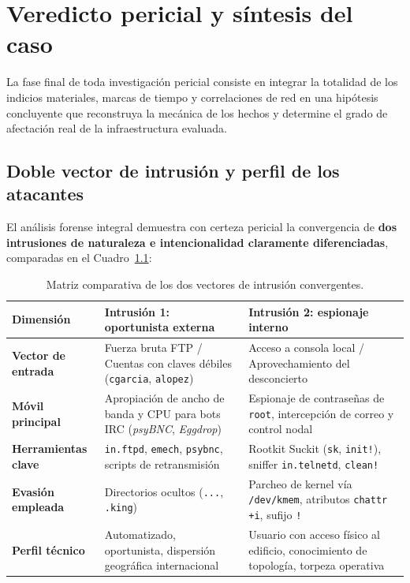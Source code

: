 \chapter{Veredicto pericial y síntesis del caso}
\label{cap:veredicto_y_atribucion}

La fase final de toda investigación pericial consiste en integrar la totalidad de los indicios materiales, marcas de tiempo y correlaciones de red en una hipótesis concluyente que reconstruya la mecánica de los hechos y determine el grado de afectación real de la infraestructura evaluada.

\section{Doble vector de intrusión y perfil de los atacantes}

El análisis forense integral demuestra con certeza pericial la convergencia de \textbf{dos intrusiones de naturaleza e intencionalidad claramente diferenciadas}, comparadas en el Cuadro~\ref{tab:comparativa_intrusiones}:

\begin{table}[htbp]
\centering
\small
\begin{tabularx}{\textwidth}{@{} l X X @{}}
\toprule
\textbf{Dimensión} & \textbf{Intrusión 1: oportunista externa} & \textbf{Intrusión 2: espionaje interno} \\
\midrule
\textbf{Vector de entrada} & Fuerza bruta FTP / Cuentas con claves débiles (\texttt{cgarcia}, \texttt{alopez}) & Acceso a consola local / Aprovechamiento del desconcierto \\
\addlinespace
\textbf{Móvil principal} & Apropiación de ancho de banda y CPU para bots IRC (\textit{psyBNC}, \textit{Eggdrop}) & Espionaje de contraseñas de \texttt{root}, intercepción de correo y control nodal \\
\addlinespace
\textbf{Herramientas clave} & \texttt{in.ftpd}, \texttt{emech}, \texttt{psybnc}, scripts de retransmisión & Rootkit Suckit (\texttt{sk}, \texttt{init!}), sniffer \texttt{in.telnetd}, \texttt{clean!} \\
\addlinespace
\textbf{Evasión empleada} & Directorios ocultos (\texttt{...}, \texttt{.king}) & Parcheo de kernel vía \texttt{/dev/kmem}, atributos \texttt{chattr +i}, sufijo \texttt{!} \\
\addlinespace
\textbf{Perfil técnico} & Automatizado, oportunista, dispersión geográfica internacional & Usuario con acceso físico al edificio, conocimiento de topología, torpeza operativa \\
\bottomrule
\end{tabularx}
\caption{Matriz comparativa de los dos vectores de intrusión convergentes.}
\label{tab:comparativa_intrusiones}
\end{table}

